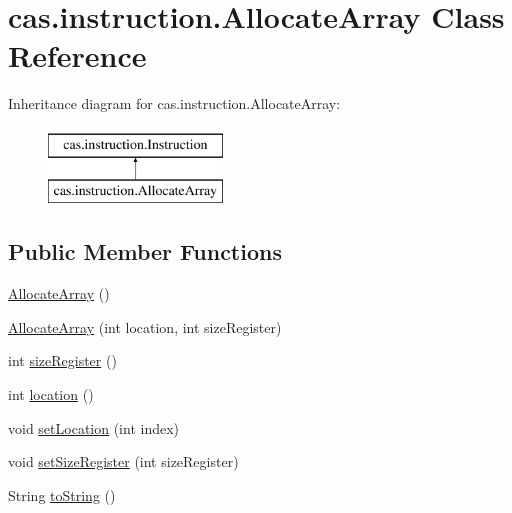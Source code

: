 \hypertarget{classcas_1_1instruction_1_1_allocate_array}{\section{cas.\-instruction.\-Allocate\-Array Class Reference}
\label{classcas_1_1instruction_1_1_allocate_array}
}
Inheritance diagram for cas.\-instruction.\-Allocate\-Array\-:\begin{figure}[H]
\begin{center}
\leavevmode
\includegraphics[height=2.000000cm]{classcas_1_1instruction_1_1_allocate_array}
\end{center}
\end{figure}
\subsection*{Public Member Functions}
\begin{DoxyCompactItemize}
\item 
\hyperlink{classcas_1_1instruction_1_1_allocate_array_a0df63de75ffdfe7c4097ff0667b63ea9}{Allocate\-Array} ()
\item 
\hyperlink{classcas_1_1instruction_1_1_allocate_array_a7acc69b0c436ad1005ed28cd5423ec29}{Allocate\-Array} (int location, int size\-Register)
\item 
int \hyperlink{classcas_1_1instruction_1_1_allocate_array_a607355f28f37787c87bb8799a48060b6}{size\-Register} ()
\item 
int \hyperlink{classcas_1_1instruction_1_1_allocate_array_afd6ab3ceecf895ee7548dc2c1a4a3787}{location} ()
\item 
void \hyperlink{classcas_1_1instruction_1_1_allocate_array_ad91621f2e7f4a9f062b9533986ff8019}{set\-Location} (int index)
\item 
void \hyperlink{classcas_1_1instruction_1_1_allocate_array_ad1d595b04d7f79c5be48a5f87cdd746b}{set\-Size\-Register} (int size\-Register)
\item 
String \hyperlink{classcas_1_1instruction_1_1_allocate_array_a7793a78d23230af92e5d996a6d63ee33}{to\-String} ()
\end{DoxyCompactItemize}


